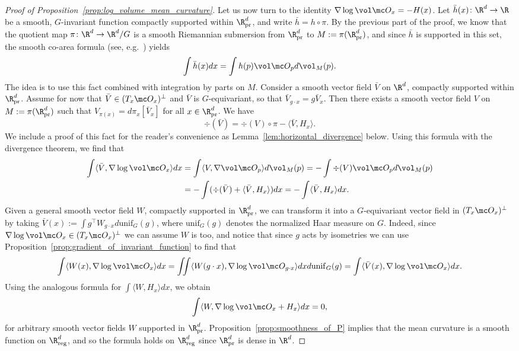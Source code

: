\documentclass[twoside,a4paper,11pt]{article}
\newcommand{\pr}{\mathrm{pr}}
\newcommand{\reg}{\mathrm{reg}}
\theoremstyle{plain}
\begin{document}
\begin{proof}[Proof of Proposition~\ref{prop:log_volume_mean_curvature}]
Let us now turn to
the identity
$\nabla \log \vol \mc O_x = -H(x)$.
Let $\bar h(x) \colon \R^d \to \R$
be a smooth,
$G$-invariant function compactly supported within $\R^d_{\pr}$,
and write $\bar h = h \circ \pi$. By the previous part
of the proof, we know that the quotient map $\pi \colon \R^d \to \R^d/G$ 
is a smooth Riemannian submersion from $\R^d_{\pr}$ to $M := \pi(\R^d_\pr)$,
and since
$\bar h$ is supported in this set, the smooth co-area formula (see, e.g.~\cite[Section 2.6]{simon2014introduction}) yields
$$
\int \bar h(x) d x= \int h(p)\vol \mc O_p  d \vol_{M}(p).
$$
The idea is to use this fact combined with
integration by parts on $M$. Consider a smooth vector field $\bar V$ on $\R^d$,
compactly
supported within $\R^d_{\pr}$. Assume for now that
$\bar V \in (T_x \mc O_x)^{\perp}$ and $\bar V$ is $G$-equivariant,
so that $\bar V_{g\cdot x} = g\bar V_{x}$.
Then there exists a smooth vector field $V$ on $M := \pi(\R^d_\pr)$ such that $ V_{\pi(x)} = d\pi_x[\bar V_x]$ for all $x \in \R^d_{\pr}$.
We have
$$
\div(\bar V) = \div(V) \circ \pi - \langle \bar V, H_x \rangle.
$$ We include a proof of this
fact for the reader's convenience
as Lemma~\ref{lem:horizontal_divergence}
below.
Using this formula with the divergence theorem, we find that
\begin{align*}
    \int \langle \bar V, \nabla \log \vol \mc O_x \rangle d x
    &= \int \langle V, \nabla \vol \mc O_p \rangle d \vol_M(p)
    = -\int \div(V) \vol \mc O_p d \vol_M(p) \\
    &=-\int (\div(\bar V) + \langle \bar V, H_x \rangle) d x = 
    -\int \langle \bar V, H_x \rangle d x.
\end{align*} 
Given a general smooth vector field $W$,
compactly supported in $\R^d_{\pr}$,
we can transform it into a $G$-equivariant vector field
in $(T_x \mc O_x)^{\perp}$
by taking $\bar V(x) := \int g^\top W_{g\cdot x} d \mathrm{unif}_G(g)$,
where $\mathrm{unif}_G(g)$ denotes the normalized Haar measure on $G$.
Indeed, since $\nabla \log \vol \mc O_x \in (T_x \mc O_x)^{\perp}$
we can assume $W$ is too,
and notice that since $g$ acts by isometries we 
can use Proposition~\ref{prop:gradient_of_invariant_function}
to find that
$$
\int \langle W(x), \nabla \log \vol \mc O_x \rangle
d x = \iint \langle W(g\cdot x), \nabla \log \vol \mc O_{g\cdot x} \rangle 
d x d \mathrm{unif}_G(g)
= \int \langle \bar V(x), \nabla \log \vol \mc O_x \rangle d x.
$$ Using the analogous formula for $\int \langle  W, H_x\rangle d x$,
we obtain
$$
\int \langle W, \nabla \log \vol \mc O_x + H_x \rangle d x =0,
$$ for arbitrary smooth vector fields $W$ supported in $\R^d_{\pr}$.
Proposition~\ref{prop:smoothness_of_P}
implies that the mean curvature is a smooth function on $\R^d_{\reg}$,
and so the formula holds on $\R^d_{\reg}$
since $\R^d_{\pr}$ is dense in $\R^d$.
\end{proof}
\end{document}
